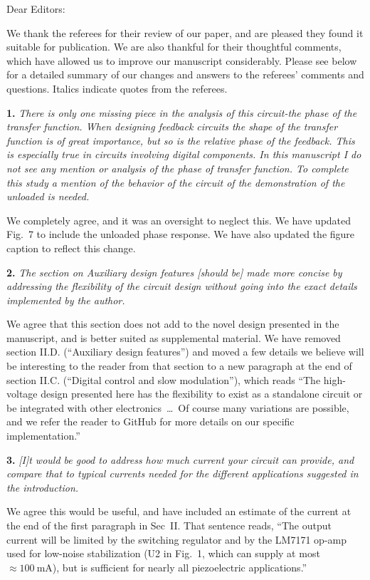 \documentclass[12pt, oneside]{letter}   	%
\begin{document}
Dear Editors:

We thank the referees for their review of our paper, and are pleased they found it suitable for publication.
We are also thankful for their thoughtful comments, which have allowed us to improve our manuscript considerably.
Please see below for a detailed summary of our changes and answers to the referees' comments and questions.
Italics indicate quotes from the referees.


\textbf{1.}
\textit{There is only one missing piece in the analysis of this circuit-the phase of the transfer function. 
When designing feedback circuits the shape of the transfer function is of great importance, but so is the relative phase of the feedback. 
This is especially true in circuits involving digital components. 
In this manuscript I do not see any mention or analysis of the phase of transfer function. 
To complete this study a mention of the behavior of the circuit of the demonstration of the unloaded is needed.}

We completely agree, and it was an oversight to neglect this.
We have updated Fig.~7 to include the unloaded phase response.
We have also updated the figure caption to reflect this change.


\textbf{2.}
\textit{The section on Auxiliary design features [should be] made more concise by addressing the flexibility of the circuit design without going into the exact details implemented by the author. }

We agree that this section does not add to the novel design presented in the manuscript, and is better suited as supplemental material.
We have removed section II.D. (``Auxiliary design features'') and moved a few details we believe will be interesting to the reader from that section to a new paragraph at the end of section II.C. (``Digital control and slow modulation''), which reads ``The high-voltage design presented here has the flexibility to exist as a standalone circuit or be integrated with other electronics~\ldots~Of course many variations are possible, and we refer the reader to GitHub for more details on our specific implementation.''

\textbf{3.}
\textit{[I]t would be good to address how much current your circuit can provide, and compare that to typical currents needed for the different applications suggested in the introduction.}

We agree this would be useful, and have included an estimate of the current at the end of the first paragraph in Sec~II.
That sentence reads, ``The output current will be limited by the switching regulator and by the LM7171 op-amp used for low-noise stabilization (U2 in Fig.~1, which can supply at most $\approx\SI{100}{\milli\ampere}$), but is sufficient for nearly all piezoelectric applications.''
\end{document}
